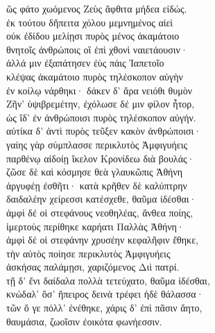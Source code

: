 \begin{pages}
\begin{Leftside}
\quad{}ὣς φάτο χωόμενος Ζεὺς ἄφθιτα μήδεα εἰδώς. \\
ἐκ τούτου δἤπειτα χόλου μεμνημένος αἰεὶ \\
οὐκ ἐδίδου μελίῃσι πυρὸς μένος ἀκαμάτοιο\\
θνητοῖς ἀνθρώποις οἳ ἐπὶ χθονὶ ναιετάουσιν· \\
ἀλλά μιν ἐξαπάτησεν ἐὺς πάις Ἰαπετοῖο \\
κλέψας ἀκαμάτοιο πυρὸς τηλέσκοπον αὐγὴν\\
ἐν κοίλῳ νάρθηκι· δάκεν δ' ἄρα νειόθι θυμὸν\\
Ζῆν' ὑψιβρεμέτην, ἐχόλωσε δέ μιν φίλον ἦτορ,\\
ὡς ἴδ' ἐν ἀνθρώποισι πυρὸς τηλέσκοπον αὐγήν.\\
αὐτίκα δ' ἀντὶ πυρὸς τεῦξεν κακὸν ἀνθρώποισι·  \\
γαίης γὰρ σύμπλασσε περικλυτὸς Ἀμφιγυήεις\\
παρθένῳ αἰδοίῃ ἴκελον Κρονίδεω διὰ βουλάς· \\
ζῶσε δὲ καὶ κόσμησε θεὰ γλαυκῶπις Ἀθήνη\\
ἀργυφέῃ ἐσθῆτι· κατὰ κρῆθεν δὲ καλύπτρην \\
δαιδαλέην χείρεσσι κατέσχεθε, θαῦμα ἰδέσθαι·  \\
ἀμφὶ δέ οἱ στεφάνους νεοθηλέας, ἄνθεα ποίης,\\
ἱμερτοὺς περίθηκε καρήατι Παλλὰς Ἀθήνη· \\
ἀμφὶ δέ οἱ στεφάνην χρυσέην κεφαλῆφιν ἔθηκε,\\
τὴν αὐτὸς ποίησε περικλυτὸς Ἀμφιγυήεις\\
ἀσκήσας παλάμῃσι, χαριζόμενος Διὶ πατρί. \\
τῇ δ' ἔνι δαίδαλα πολλὰ τετεύχατο, θαῦμα ἰδέσθαι,\\
κνώδαλ' ὅσ' ἤπειρος δεινὰ τρέφει ἠδὲ θάλασσα·\\
τῶν ὅ γε πόλλ' ἐνέθηκε, χάρις δ' ἐπὶ πᾶσιν ἄητο,\\
θαυμάσια, ζωοῖσιν ἐοικότα φωνήεσσιν.\\


\end{Leftside}
\end{pages}
